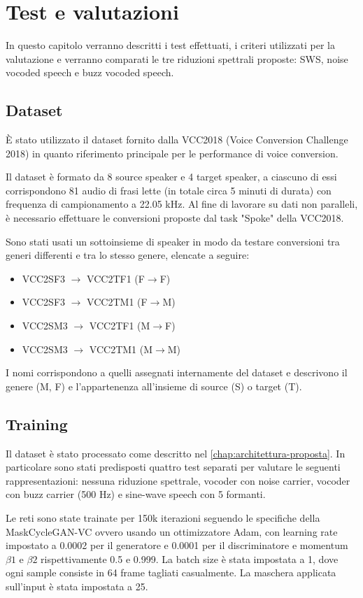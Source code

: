 \chapter{Test e valutazioni}
		In questo capitolo verranno descritti i test effettuati, i criteri utilizzati per la valutazione e verranno comparati le tre riduzioni spettrali proposte: SWS, noise vocoded speech e buzz vocoded speech.
		
		\section{Dataset}
		È stato utilizzato il dataset fornito dalla VCC2018 (Voice Conversion Challenge 2018) in quanto riferimento principale per le performance di voice conversion.
		
		Il dataset è formato da 8 source speaker e 4 target speaker, a ciascuno di essi corrispondono 81 audio di frasi lette (in totale circa 5 minuti di durata) con frequenza di campionamento a 22.05 kHz. Al fine di lavorare su dati non paralleli, è necessario effettuare le conversioni proposte dal task "Spoke" della VCC2018.
		
		Sono stati usati un sottoinsieme di speaker in modo da testare conversioni tra generi differenti e tra lo stesso genere, elencate a seguire:
		\begin{itemize}
			\item VCC2SF3 $\rightarrow$ VCC2TF1 (F$\rightarrow$F)
			\item VCC2SF3 $\rightarrow$ VCC2TM1 (F$\rightarrow$M)
			\item VCC2SM3 $\rightarrow$ VCC2TF1 (M$\rightarrow$F)
			\item VCC2SM3 $\rightarrow$ VCC2TM1 (M$\rightarrow$M)
		\end{itemize}
		I nomi corrispondono a quelli assegnati internamente del dataset e descrivono il genere (M, F) e l'appartenenza all'insieme di source (S) o target (T).
		
		\section{Training}
		Il dataset è stato processato come descritto nel \autoref{chap:architettura-proposta}. In particolare sono stati predisposti quattro test separati per valutare le seguenti rappresentazioni: nessuna riduzione spettrale, vocoder con noise carrier, vocoder con buzz carrier (500 Hz) e sine-wave speech con 5 formanti.
		
		Le reti sono state trainate per 150k iterazioni seguendo le specifiche della MaskCycleGAN-VC ovvero usando un ottimizzatore Adam, con learning rate impostato a 0.0002 per il generatore e 0.0001 per il discriminatore e momentum $\beta1$ e $\beta2$ rispettivamente 0.5 e 0.999. La batch size è stata impostata a 1, dove ogni sample consiste in 64 frame tagliati casualmente. La maschera applicata sull'input è stata impostata a 25.
		
